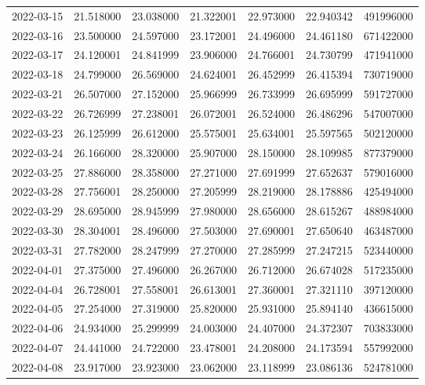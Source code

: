 \begin{tabular}{lrrrrrr}
2022-03-15 &   21.518000 &   23.038000 &   21.322001 &   22.973000 &   22.940342 &   491996000 \\
2022-03-16 &   23.500000 &   24.597000 &   23.172001 &   24.496000 &   24.461180 &   671422000 \\
2022-03-17 &   24.120001 &   24.841999 &   23.906000 &   24.766001 &   24.730799 &   471941000 \\
2022-03-18 &   24.799000 &   26.569000 &   24.624001 &   26.452999 &   26.415394 &   730719000 \\
2022-03-21 &   26.507000 &   27.152000 &   25.966999 &   26.733999 &   26.695999 &   591727000 \\
2022-03-22 &   26.726999 &   27.238001 &   26.072001 &   26.524000 &   26.486296 &   547007000 \\
2022-03-23 &   26.125999 &   26.612000 &   25.575001 &   25.634001 &   25.597565 &   502120000 \\
2022-03-24 &   26.166000 &   28.320000 &   25.907000 &   28.150000 &   28.109985 &   877379000 \\
2022-03-25 &   27.886000 &   28.358000 &   27.271000 &   27.691999 &   27.652637 &   579016000 \\
2022-03-28 &   27.756001 &   28.250000 &   27.205999 &   28.219000 &   28.178886 &   425494000 \\
2022-03-29 &   28.695000 &   28.945999 &   27.980000 &   28.656000 &   28.615267 &   488984000 \\
2022-03-30 &   28.304001 &   28.496000 &   27.503000 &   27.690001 &   27.650640 &   463487000 \\
2022-03-31 &   27.782000 &   28.247999 &   27.270000 &   27.285999 &   27.247215 &   523440000 \\
2022-04-01 &   27.375000 &   27.496000 &   26.267000 &   26.712000 &   26.674028 &   517235000 \\
2022-04-04 &   26.728001 &   27.558001 &   26.613001 &   27.360001 &   27.321110 &   397120000 \\
2022-04-05 &   27.254000 &   27.319000 &   25.820000 &   25.931000 &   25.894140 &   436615000 \\
2022-04-06 &   24.934000 &   25.299999 &   24.003000 &   24.407000 &   24.372307 &   703833000 \\
2022-04-07 &   24.441000 &   24.722000 &   23.478001 &   24.208000 &   24.173594 &   557992000 \\
2022-04-08 &   23.917000 &   23.923000 &   23.062000 &   23.118999 &   23.086136 &   524781000 \\

\end{tabular}
